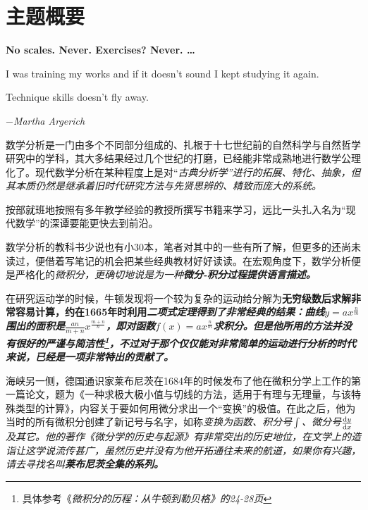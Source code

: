 \chapter*{主题概要}

\epigraph{\bfseries No scales. Never. Exercises? Never. \dots \par I was training my works and if it doesn't sound I kept studying it again. \par Technique skills doesn't fly away.}{$-$\it{Martha Argerich}}

数学分析是一门由多个不同部分组成的、扎根于十七世纪前的自然科学与自然哲学研究中的学科，其大多结果经过几个世纪的打磨，已经能非常成熟地进行数学公理化了。现代数学分析在某种程度上是对“\it{古典分析学}”进行的拓展、特化、抽象，但其本质仍然是继承着旧时代研究方法与先贤思辨的、精致而庞大的系统。

按部就班地按照有多年教学经验的教授所撰写书籍来学习，远比一头扎入名为“现代数学”的深谭要能更快去到前沿。

数学分析的教科书少说也有小30本，笔者对其中的一些有所了解，但更多的还尚未读过，便借着写笔记的机会把某些经典教材好好读读。在宏观角度下，数学分析便是严格化的\it{微积分}，更确切地说是为一种\bf{微分-积分}过程提供语言描述。

在研究运动学的时候，牛顿发现将一个较为复杂的运动给分解为\bf{无穷级数}后求解非常容易计算，约在1665年时利用\it{二项式定理}得到了非常经典的结果：\it{曲线$y=ax^\frac{n}{m}$围出的面积是$\frac{an}{m+n}x^\frac{m+n}{n}$}，即对函数$f(x)=ax^\frac{n}{m}$求积分。但是他所用的方法并没有很好的严谨与简洁性\footnote{具体参考《\it{微积分的历程：从牛顿到勒贝格}》的24-28页}，不过对于那个仅仅能对非常简单的运动进行分析的时代来说，已经是一项非常特出的贡献了。

海峡另一侧，德国通识家莱布尼茨在1684年的时候发布了他在微积分学上工作的第一篇论文，题为《一种求极大极小值与切线的方法，适用于有理与无理量，与该特殊类型的计算》，内容关于要如何用微分求出一个“变换”的极值。在此之后，他为当时的所有微积分创建了新记号与名字，如称\it{变换}为\it{函数}、积分号$\int$、微分号$\frac{\mathrm{d}y}{\mathrm{d}x}$及其它。他的著作《微分学的历史与起源》有非常突出的历史地位，在文学上的造诣让这学说流传甚广，虽然历史并没有为他开拓通往未来的航道，如果你有兴趣，请去寻找名叫\bf{莱布尼茨全集}的系列。

